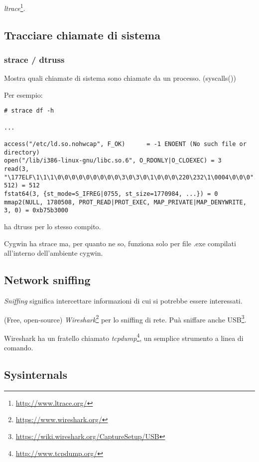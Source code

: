 \emph{ltrace}\footnote{\url{http://www.ltrace.org/}}.

\subsection{Tracciare chiamate di sistema}

\label{strace}
\subsubsection{strace / dtruss}

Mostra quali chiamate di sistema sono chiamate da un processo. (syscalls())

Per esempio:

\begin{lstlisting}
# strace df -h

...

access("/etc/ld.so.nohwcap", F_OK)      = -1 ENOENT (No such file or directory)
open("/lib/i386-linux-gnu/libc.so.6", O_RDONLY|O_CLOEXEC) = 3
read(3, "\177ELF\1\1\1\0\0\0\0\0\0\0\0\0\3\0\3\0\1\0\0\0\220\232\1\0004\0\0\0"..., 512) = 512
fstat64(3, {st_mode=S_IFREG|0755, st_size=1770984, ...}) = 0
mmap2(NULL, 1780508, PROT_READ|PROT_EXEC, MAP_PRIVATE|MAP_DENYWRITE, 3, 0) = 0xb75b3000
\end{lstlisting}

\myindex{\MacOSX}
\MacOSX ha dtruss per lo stesso compito.

Cygwin ha strace ma, per quanto ne so, funziona solo per file .exe compilati all'interno dell'ambiente
cygwin.

\subsection{Network sniffing}

\emph{Sniffing} significa intercettare informazioni di cui si potrebbe essere interessati.

(Free, open-source) \emph{Wireshark}\footnote{\url{https://www.wireshark.org/}} per lo sniffing di rete.
Puà sniffare anche USB\footnote{\url{https://wiki.wireshark.org/CaptureSetup/USB}}.

Wireshark ha un fratello chiamato \emph{tcpdump}\footnote{\url{http://www.tcpdump.org/}}, un semplice strumento a linea di comando.

\subsection{Sysinternals}

